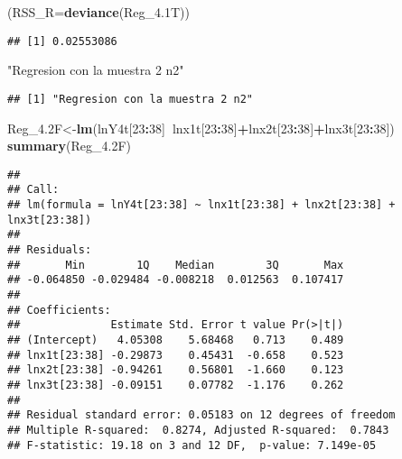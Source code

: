 \documentclass[
]{article}
\newenvironment{Shaded}{\begin{snugshade}}{\end{snugshade}}
\newcommand{\DataTypeTok}[1]{\textcolor[rgb]{0.13,0.29,0.53}{#1}}
\newcommand{\DecValTok}[1]{\textcolor[rgb]{0.00,0.00,0.81}{#1}}
\newcommand{\FloatTok}[1]{\textcolor[rgb]{0.00,0.00,0.81}{#1}}
\newcommand{\KeywordTok}[1]{\textcolor[rgb]{0.13,0.29,0.53}{\textbf{#1}}}
\newcommand{\NormalTok}[1]{#1}
\newcommand{\OperatorTok}[1]{\textcolor[rgb]{0.81,0.36,0.00}{\textbf{#1}}}
\newcommand{\StringTok}[1]{\textcolor[rgb]{0.31,0.60,0.02}{#1}}
\begin{document}
\begin{Shaded}
\begin{Highlighting}[]
\NormalTok{(}\DataTypeTok{RSS_R=}\KeywordTok{deviance}\NormalTok{(Reg_}\FloatTok{4.1}\NormalTok{T))}
\end{Highlighting}
\end{Shaded}

\begin{verbatim}
## [1] 0.02553086
\end{verbatim}

\begin{Shaded}
\begin{Highlighting}[]
\StringTok{"Regresion con la muestra 2 n2"}
\end{Highlighting}
\end{Shaded}

\begin{verbatim}
## [1] "Regresion con la muestra 2 n2"
\end{verbatim}

\begin{Shaded}
\begin{Highlighting}[]
\NormalTok{Reg_}\FloatTok{4.2}\NormalTok{F<-}\KeywordTok{lm}\NormalTok{(lnY4t[}\DecValTok{23}\OperatorTok{:}\DecValTok{38}\NormalTok{]}\OperatorTok{~}\NormalTok{lnx1t[}\DecValTok{23}\OperatorTok{:}\DecValTok{38}\NormalTok{]}\OperatorTok{+}\NormalTok{lnx2t[}\DecValTok{23}\OperatorTok{:}\DecValTok{38}\NormalTok{]}\OperatorTok{+}\NormalTok{lnx3t[}\DecValTok{23}\OperatorTok{:}\DecValTok{38}\NormalTok{])}
\KeywordTok{summary}\NormalTok{(Reg_}\FloatTok{4.2}\NormalTok{F)}
\end{Highlighting}
\end{Shaded}

\begin{verbatim}
## 
## Call:
## lm(formula = lnY4t[23:38] ~ lnx1t[23:38] + lnx2t[23:38] + lnx3t[23:38])
## 
## Residuals:
##       Min        1Q    Median        3Q       Max 
## -0.064850 -0.029484 -0.008218  0.012563  0.107417 
## 
## Coefficients:
##              Estimate Std. Error t value Pr(>|t|)
## (Intercept)   4.05308    5.68468   0.713    0.489
## lnx1t[23:38] -0.29873    0.45431  -0.658    0.523
## lnx2t[23:38] -0.94261    0.56801  -1.660    0.123
## lnx3t[23:38] -0.09151    0.07782  -1.176    0.262
## 
## Residual standard error: 0.05183 on 12 degrees of freedom
## Multiple R-squared:  0.8274, Adjusted R-squared:  0.7843 
## F-statistic: 19.18 on 3 and 12 DF,  p-value: 7.149e-05
\end{verbatim}
\end{document}
